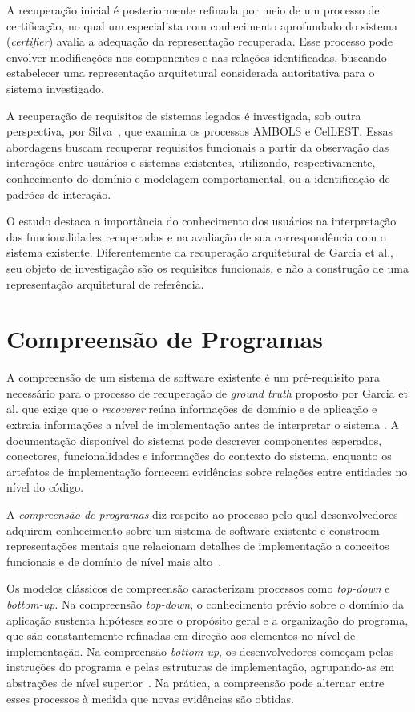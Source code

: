 A recuperação inicial é posteriormente refinada
por meio de um processo de certificação, no qual
um especialista com conhecimento aprofundado
do sistema (\textit{certifier}) avalia a adequação
da representação recuperada. Esse processo pode
envolver modificações nos componentes e nas
relações identificadas, buscando estabelecer
uma representação arquitetural considerada
autoritativa para o sistema investigado.

A recuperação de requisitos de sistemas legados
é investigada, sob outra perspectiva, por
Silva~\cite{TARCILArecreq}, que examina os
processos AMBOLS e CelLEST. Essas abordagens
buscam recuperar requisitos funcionais a partir
da observação das interações entre usuários
e sistemas existentes, utilizando, respectivamente,
conhecimento do domínio e modelagem comportamental,
ou a identificação de padrões de interação.

O estudo destaca a importância do conhecimento
dos usuários na interpretação das funcionalidades
recuperadas e na avaliação de sua correspondência
com o sistema existente. Diferentemente da
recuperação arquitetural de Garcia et al.,
seu objeto de investigação são os requisitos
funcionais, e não a construção de uma representação
arquitetural de referência.


\section{Compreensão de Programas}

A compreensão de um sistema de software existente é um pré-requisito para necessário para o processo de recuperação de \textit{ground truth} proposto por Garcia et al. que exige que o \textit{recoverer} reúna informações de domínio e de aplicação e extraia informações a nível de implementação antes de interpretar o sistema \cite{GarciaKMD12}. A documentação disponível do sistema pode descrever componentes esperados, conectores, funcionalidades e informações do contexto do sistema, enquanto os artefatos de implementação fornecem evidências sobre relações entre entidades no nível do código.

A \textit{compreensão de programas} diz respeito ao processo pelo qual desenvolvedores adquirem conhecimento sobre um sistema de software existente e constroem representações mentais que relacionam detalhes de implementação a conceitos funcionais e de domínio de nível mais alto~\cite{von,Siegmund}.

Os modelos clássicos de compreensão caracterizam processos como \textit{top-down} e \textit{bottom-up}. Na compreensão \textit{top-down}, o conhecimento prévio sobre o domínio da aplicação sustenta hipóteses sobre o propósito geral e a organização do programa, que são constantemente refinadas em direção aos elementos no nível de implementação. Na compreensão \textit{bottom-up}, os desenvolvedores começam pelas instruções do programa e pelas estruturas de implementação, agrupando-as em abstrações de nível superior~\cite{von,Siegmund}. Na prática, a compreensão pode alternar entre esses processos à medida que novas evidências são obtidas.

